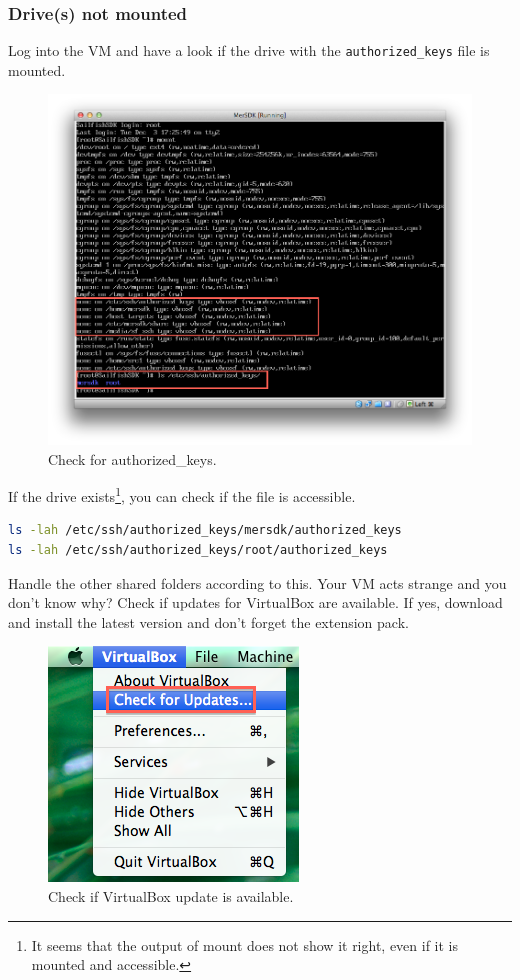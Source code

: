 \subsubsection{Drive(s) not mounted}\label{subsubsec:ts:nodrive}
%
Log into the VM and have a look if the drive with the \verb,authorized_keys, file is mounted.
\begin{figure}[H]
  \centering
  \includegraphics[scale=0.5]{../media/gfx/VirtualBox/vboxmersdkcheckdrives.png} 
  \caption{Check for authorized\_keys.}
  \label{fig:vboxmersdkcheckdrives}
\end{figure}
%
If the drive exists\footnote{It seems that the output of mount does not show it right, even if it is mounted and accessible.}, you can check if the file is accessible.
\begin{lstlisting}[language=bash]
ls -lah /etc/ssh/authorized_keys/mersdk/authorized_keys
ls -lah /etc/ssh/authorized_keys/root/authorized_keys
\end{lstlisting}
%
Handle the other shared folders according to this.
%
Your VM acts strange and you don't know why? Check if updates for VirtualBox are available. If yes, download and install the latest version and don't forget the extension pack.
%
\begin{figure}[H]
  \centering
  \includegraphics[scale=0.6]{../media/gfx/VirtualBox/vboxisupdateavailable.png} 
  \caption{Check if VirtualBox update is available.}
  \label{fig:vboxisupdateavailable}
\end{figure}
